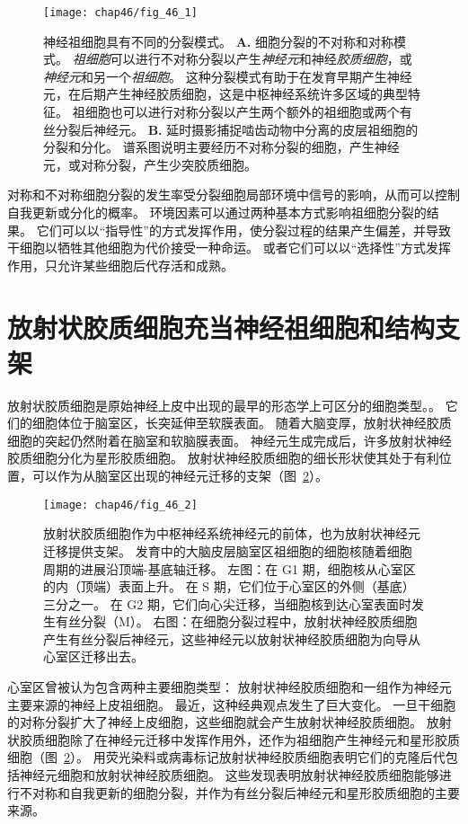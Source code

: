 \begin{figure}[htbp]
	\centering
	\texttt{[image: chap46/fig\_46\_1]}
	\caption{神经祖细胞具有不同的分裂模式。
		\textbf{A.} 细胞分裂的不对称和对称模式。
		\textit{祖细胞}可以进行不对称分裂以产生\textit{神经元}和神经\textit{胶质细胞}，或\textit{神经元}和另一个\textit{祖细胞}。
		这种分裂模式有助于在发育早期产生神经元，在后期产生神经胶质细胞，这是中枢神经系统许多区域的典型特征。
		祖细胞也可以进行对称分裂以产生两个额外的祖细胞或两个有丝分裂后神经元。
		\textbf{B.} 延时摄影捕捉啮齿动物中分离的皮层祖细胞的分裂和分化。
		谱系图说明主要经历不对称分裂的细胞，产生神经元，或对称分裂，产生少突胶质细胞\cite{qian1998intrinsic}。}
	\label{fig:46_1}
\end{figure}


对称和不对称细胞分裂的发生率受分裂细胞局部环境中信号的影响，从而可以控制自我更新或分化的概率。
环境因素可以通过两种基本方式影响祖细胞分裂的结果。 它们可以以“指导性”的方式发挥作用，使分裂过程的结果产生偏差，并导致干细胞以牺牲其他细胞为代价接受一种命运。
或者它们可以以“选择性”方式发挥作用，只允许某些细胞后代存活和成熟。



\section{放射状胶质细胞充当神经祖细胞和结构支架}

放射状胶质细胞是原始神经上皮中出现的最早的形态学上可区分的细胞类型。。
它们的细胞体位于脑室区，长突延伸至软膜表面。
随着大脑变厚，放射状神经胶质细胞的突起仍然附着在脑室和软脑膜表面。
神经元生成完成后，许多放射状神经胶质细胞分化为星形胶质细胞。
放射状神经胶质细胞的细长形状使其处于有利位置，可以作为从脑室区出现的神经元迁移的支架（图~\ref{fig:46_2}）。


\begin{figure}[htbp]
	\centering
	\texttt{[image: chap46/fig\_46\_2]}
	\caption{放射状胶质细胞作为中枢神经系统神经元的前体，也为放射状神经元迁移提供支架。
		发育中的大脑皮层脑室区祖细胞的细胞核随着细胞周期的进展沿顶端-基底轴迁移。
		左图：在 G1 期，细胞核从心室区的内（顶端）表面上升。
		在 S 期，它们位于心室区的外侧（基底）三分之一。
		在 G2 期，它们向心尖迁移，当细胞核到达心室表面时发生有丝分裂（M）。
		右图：在细胞分裂过程中，放射状神经胶质细胞产生有丝分裂后神经元，这些神经元以放射状神经胶质细胞为向导从心室区迁移出去。}
	\label{fig:46_2}
\end{figure}


心室区曾被认为包含两种主要细胞类型：
放射状神经胶质细胞和一组作为神经元主要来源的神经上皮祖细胞。
最近，这种经典观点发生了巨大变化。
一旦干细胞的对称分裂扩大了神经上皮细胞，这些细胞就会产生放射状神经胶质细胞。
放射状胶质细胞除了在神经元迁移中发挥作用外，还作为祖细胞产生神经元和星形胶质细胞（图~\ref{fig:46_2}）。
用荧光染料或病毒标记放射状神经胶质细胞表明它们的克隆后代包括神经元细胞和放射状神经胶质细胞。
这些发现表明放射状神经胶质细胞能够进行不对称和自我更新的细胞分裂，并作为有丝分裂后神经元和星形胶质细胞的主要来源。



